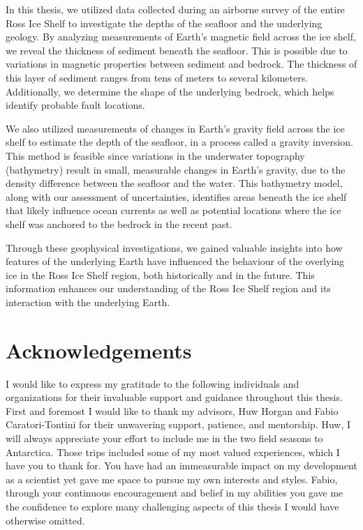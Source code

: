 \documentclass[12pt,twoside]{book}
\begin{document}
In this thesis, we utilized data collected during an airborne survey of the entire Ross Ice Shelf to investigate the depths of the seafloor and the underlying geology. By analyzing measurements of Earth's magnetic field across the ice shelf, we reveal the thickness of sediment beneath the seafloor. This is possible due to variations in magnetic properties between sediment and bedrock. The thickness of this layer of sediment ranges from tens of meters to several kilometers. Additionally, we determine the shape of the underlying bedrock, which helps identify probable fault locations. 

We also utilized measurements of changes in Earth's gravity field across the ice shelf to estimate the depth of the seafloor, in a process called a gravity inversion. This method is feasible since variations in the underwater topography (bathymetry) result in small, measurable changes in Earth's gravity, due to the density difference between the seafloor and the water. 
This bathymetry model, along with our assessment of uncertainties, identifies areas beneath the ice shelf that likely influence ocean currents as well as potential locations where the ice shelf was anchored to the bedrock in the recent past.

Through these geophysical investigations, we gained valuable insights into how features of the underlying Earth have influenced the behaviour of the overlying ice in the Ross Ice Shelf region, both historically and in the future. This information enhances our understanding of the Ross Ice Shelf region and its interaction with the underlying Earth.


\chapter*{Acknowledgements}

I would like to express my gratitude to the following individuals and organizations for their invaluable support and guidance throughout this thesis.\\

First and foremost I would like to thank my advisors, Huw Horgan and Fabio Caratori-Tontini for their unwavering support, patience, and mentorship. Huw, I will always appreciate your effort to include me in the two field seasons to Antarctica. Those trips included some of my most valued experiences, which I have you to thank for. You have had an immeasurable impact on my development as a scientist yet gave me space to pursue my own interests and styles. Fabio, through your continuous encouragement and belief in my abilities you gave me the confidence to explore many challenging aspects of this thesis I would have otherwise omitted.\\
\end{document}
